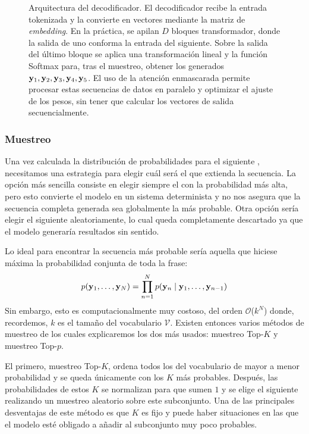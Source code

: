 \begin{figure}[t]
    \centering
    \resizebox{0.5\textwidth}{!}{
            \DiagramaDecodificador
    }
    \caption{Arquitectura del decodificador. El decodificador recibe la entrada tokenizada y la convierte en vectores mediante la matriz de \textit{embedding}. En la práctica, se apilan $D$ bloques transformador, donde la salida de uno conforma la entrada del siguiente. Sobre la salida del último bloque se aplica una transformación lineal y la función Softmax para, tras el muestreo, obtener los \tokens{} generados $\mathbf{y}_1, \mathbf{y}_2, \mathbf{y}_3,\mathbf{y}_4 ,\mathbf{y}_5$. El uso de la atención enmascarada permite procesar estas secuencias de datos en paralelo y optimizar el ajuste de los pesos, sin tener que calcular los vectores de salida secuencialmente.}
    \label{fig:diagrama_Decodificador}
\end{figure}



\subsubsection{Muestreo}
Una vez calculada la distribución de probabilidades para el siguiente \token{}, 
necesitamos una estrategia para elegir cuál será el que extienda la secuencia. 
La opción más sencilla consiste en elegir siempre el \token{} con la probabilidad 
más alta, pero esto convierte el modelo en un sistema determinista y no nos 
asegura que la secuencia completa generada sea globalmente la más probable. 
Otra opción sería elegir el siguiente \token{} aleatoriamente, lo cual queda 
completamente descartado ya que el modelo  generaría resultados sin sentido. 

Lo ideal para encontrar la secuencia más probable sería aquella que hiciese máxima 
la probabilidad conjunta de toda la frase:
\begin{equation}
    p(\mathbf{y}_1, \dots, \mathbf{y}_N) = \prod_{n=1}^{N} p(\mathbf{y}_n \mid \mathbf{y}_1, \dots, \mathbf{y}_{n-1})
\end{equation}
Sin embargo, esto es computacionalmente muy costoso, del orden 
$\mathcal{O}$($k^N$) donde, recordemos, $k$ es el tamaño del vocabulario 
$\mathcal{V}$. Existen entonces varios métodos de muestreo de los cuales 
explicaremos los dos más usados: muestreo Top-$K$ y muestreo Top-$p$. 

El primero, muestreo Top-$K$, ordena todos los \tokens{} del vocabulario de mayor 
a menor probabilidad y se queda únicamente con los ${K}$ \tokens{} más probables. 
Después, las probabilidades de estos ${K}$ \tokens{} se normalizan para que 
sumen $1$ y se elige el siguiente realizando un muestreo aleatorio sobre este 
subconjunto.
Una de las principales desventajas de este método es que ${K}$ es fijo y puede 
haber situaciones en las que el modelo esté obligado a añadir al subconjunto 
\tokens{} muy poco probables.

